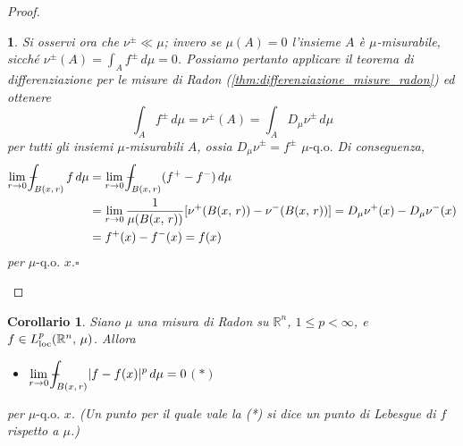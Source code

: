\documentclass[a4paper,10pt,openright,oneside]{book}
\theoremstyle{theoremstyle}
\newtheorem{corollario}[teorema]{Corollario}
\theoremstyle{theoremstylewoheader}
\theoremstyle{theoremstyle}
\theoremstyle{proofsecstyle}
\newtheorem{proofsec}{}
\theoremstyle{nonumberplain}
\newtheorem{proof}{Dim.}
\newcommand{\RR}{\ensuremath{\mathbb{R}}}
\newcommand{\Der}[2]{\ensuremath{D_#2 #1}}
\newcommand{\abs}[1]{\ensuremath{\lvert #1 \rvert}}
\newcommand{\qo}[1]{\ensuremath{#1\text{-q.o.}}}
\newcommand{\qogni}[2]{\ensuremath{#2\text{-q.o. $\!#1$}}}
\def\Xint#1{\mathchoice
	{\XXint\displaystyle\textstyle{#1}}%
	{\XXint\textstyle\scriptstyle{#1}}%
	{\XXint\scriptstyle\scriptscriptstyle{#1}}%
	{\XXint\scriptscriptstyle\scriptscriptstyle{#1}}%
	\!\int}
\def\XXint#1#2#3{{\setbox0=\hbox{$#1{#2#3}{\int}$}
	\vcenter{\hbox{$#2#3$}}\kern-.5\wd0}}
\def\dashint{\Xint-}
\renewcommand{\qedsymbol}{\ensuremath{\square}}
\newcommand{\qed}{\unskip\nobreak\hfill\nobreak\hspace{.5em}\qedsymbol}
\newcommand{\mymath}[2]{\begin{itemize}%
  \item[]\hfill\hbox{}\ensuremath{\displaystyle #1}\hfill\ensuremath{\displaystyle #2}%
  \end{itemize}}
\begin{document}
\begin{proof}
\begin{proofsec}
Si osservi ora che $\nu^\pm \ll \mu$; invero se $\mu(A) = 0$ l'insieme $A$ è $\mu$-misurabile, sicché $\nu^\pm(A) = \int_A f^\pm\, d\mu = 0$. Possiamo pertanto applicare il teorema di differenziazione per le misure di Radon (\ref{thm:differenziazione_misure_radon}) ed ottenere
\[
\int_A f^\pm\, d\mu = \nu^\pm(A) = \int_A \Der{\nu}{\mu}^\pm\, d\mu
\]
per tutti gli insiemi $\mu$-misurabili $A$, ossia $\Der{\nu}{\mu}^\pm = f^\pm$ $\qo{\mu}$ Di conseguenza,
\begin{align*}
\lim_{r \to 0} \dashint_{B(x,\, r)} f\, d\mu &= \lim_{r \to 0} \dashint_{B(x,\, r)} (f^+ - f^-)\, d\mu\\
&= \lim_{r \to 0} \frac{1}{\mu(B(x,\, r))} [\nu^+(B(x,\, r)) - \nu^-(B(x,\, r))] = \Der{\nu}{\mu}^+(x) - \Der{\nu}{\mu}^-(x)\\
&= f^+(x) - f^-(x) = f(x)
\end{align*}
per $\qogni{x}{\mu}$.\qed
\end{proofsec}
\end{proof}

\begin{corollario}
\label{cor:punti_di_lebesgue}
Siano $\mu$ una misura di Radon su $\RR^n$, $1 \le p < \infty$, e $f \in L_\textup{loc}^p(\RR^n,\, \mu)$. Allora \mymath{\lim_{r \to 0} \dashint_{B(x,\, r)} \abs{f - f(x)}^p\, d\mu = 0}{(*)} per $\qogni{x}{\mu}$. (Un punto per il quale vale la (*) si dice un \emph{punto di Lebesgue} di $f$ rispetto a $\mu$.)
\end{corollario}
\end{document}
